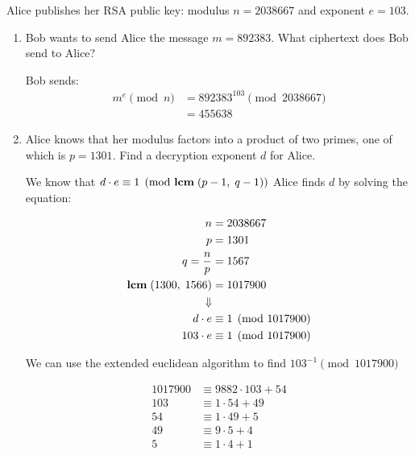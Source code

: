 \begin{problem}
Alice publishes her RSA public key: modulus $n=2038667$ and exponent $e=103$.
\begin{enumerate}\renewcommand{\itemsep}{3mm}
  \item Bob wants to send Alice the message $m=892383$.  What ciphertext does Bob send to Alice?

  \begin{Answer}
    Bob sends:
    \begin{align*}
      m^e \pmod n &= 892383^{103} \pmod{2038667} \\
      &= 455638
    \end{align*}
  \end{Answer}

\item Alice knows that her modulus factors into a product of two primes,
one of which is $p=1301$.  Find a decryption exponent $d$ for Alice.
  \begin{Answer}
    We know that $d \cdot e \equiv 1 \pmod {\mathbf{lcm}\;(p-1,\;q-1)}$ 
    Alice finds $d$ by solving the equation:
    \begin{multicols*}{2}
      \begin{align*}
        n &= 2038667 \\
        p &= 1301 \\
        q = \frac{n}{p} &= 1567 \\
        \mathbf{lcm}\;(1300,\;1566) &= 1017900 \\
        \Downarrow\\
        d \cdot e &\equiv 1 \pmod {1017900} \\
        103 \cdot e &\equiv 1 \pmod {1017900} \\
      \end{align*}

      \noindent
      We can use the extended euclidean algorithm to find $103^{-1} \pmod {1017900}$

      \begin{align*}
        1017900 &\equiv 9882 \cdot 103 + 54 \\
        103 &\equiv 1 \cdot  54 + 49 \\
        54 &\equiv 1 \cdot  49 + 5 \\
        49 &\equiv 9 \cdot  5 + 4 \\
        5 &\equiv 1 \cdot  4 + 1\\
      \end{align*}


\end{multicols*}
\end{Answer}
\end{enumerate}
\end{problem}
